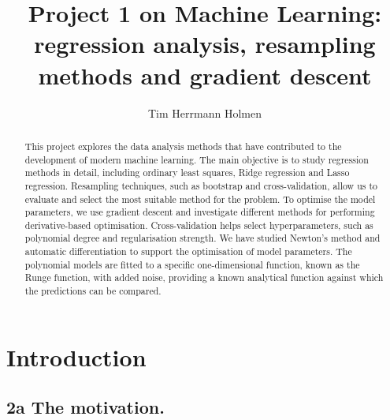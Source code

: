 \documentclass[aps,rmp,reprint,raggedbottom,amsmath,amssymb,longbibliography]{revtex4-1}
\begin{document}

\title{Project 1 on Machine Learning: regression analysis, resampling methods and gradient descent}

\author{Tim Herrmann Holmen}

\begin{abstract}
This project explores the data analysis methods that have contributed
to the development of modern machine learning. The main objective is
to study regression methods in detail, including ordinary least squares,
Ridge regression and Lasso regression. Resampling techniques, such as
bootstrap and cross-validation, allow us to evaluate and select the
most suitable method for the problem.
To optimise the model parameters, we use gradient descent and investigate
different methods for performing derivative-based optimisation.
Cross-validation helps select hyperparameters, such as polynomial degree
and regularisation strength. We have studied Newton's method and
automatic differentiation to support the optimisation of model parameters.
The polynomial models are fitted to a specific one-dimensional function,
known as the Runge function, with added noise, providing a known analytical
function against which the predictions can be compared.
\end{abstract}

\maketitle

\tableofcontents

\section{Introduction}
\subsection{2a The motivation.}
\end{document}
